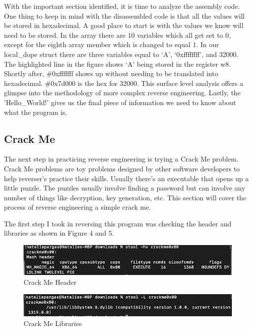 With the important section identified, it is time to analyze the assembly code.
One thing to keep in mind with the disassembled code is that all the values will be stored in hexadecimal. 
A good place to start is with the values we know will need to be stored. 
In the array there are 10 variables which all get set to 0, except for the eighth array member which is changed to equal 1. 
In our local\_dope struct there are three variables equal to ‘A’, ‘0xffffffff’, and 32000. 
The highlighted line in the figure shows ‘A’ being stored in the register w8. Shortly after, \#0xfffffff shows up without needing to be translated into hexadecimal. 
\#0x7d000 is the hex for 32000. 
This surface level analysis offers a glimpse into the methodology of more complex reverse engineering. 
Lastly, the 'Hello\_World!' gives us the final piece of information we need to know about what the program is.

\subsection{Crack Me}
The next step in practicing reverse engineering is trying a Crack Me problem. 
Crack Me problems are toy problems designed by other software developers to help reverser's practice their skills. 
Usually there’s an executable that opens up a little puzzle. 
The puzzles usually involve finding a password but can involve any number of things like decryption, key generation, etc. 
This section will cover the process of reverse engineering a simple crack me.

The first step I took in reversing this program was checking the header and libraries as shown in Figure 4 and 5.
\begin{figure}[h]
\caption{Crack Me Header}
\includegraphics{crackmeheader.png}
\end{figure}
\begin{figure}[h]
\caption{Crack Me Libraries}
\includegraphics{crackmelibs.png}
\end{figure}
  
